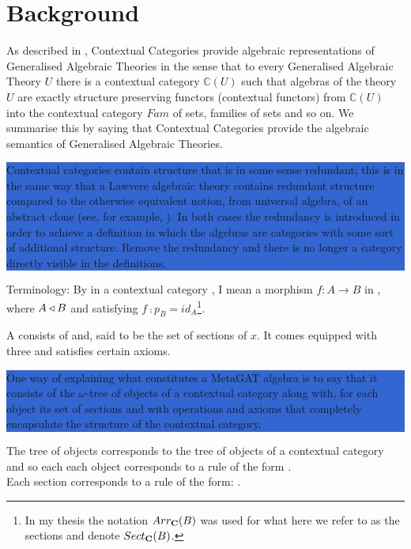 \documentclass[10pt,a4paper]{article}
\newcommand{\highlightpara}[1]{\colorbox{highlight}{%
    \parbox{\dimexpr\linewidth-2\fboxsep}%
        {#1}}
}
\begin{document}
\section{Background}
As described in \cite{Cartmell86}, Contextual Categories provide algebraic representations of Generalised Algebraic Theories  in the sense that to every Generalised Algebraic Theory $U$ there is a contextual category $\mathbb{C}(U)$ such that algebras of the theory $U$ are exactly structure preserving functors (contextual functors)  from $\mathbb{C}(U)$ into the contextual category $Fam$ of sets, families of sets and so on. We summarise this by saying that Contextual Categories provide the algebraic semantics of Generalised Algebraic Theories. 

\noindent
\highlightpara{Contextual categories contain structure that is in some sense redundant; this is in the same way that a Lawvere algebraic theory contains redundant structure compared to the otherwise equivalent notion, from universal algebra, of an abstract clone (see, for example, \cite{KerkoffonClones}). In both cases the redundancy is introduced in order to achieve a definition in which the algebras are categories with some sort of additional structure. Remove the redundancy and there is no longer a category directly visible in the definitions.}

Terminology: By 
 in a contextual category \catc, I mean a morphism $f:A\rightarrow B$ in \catc, where 
$A \triangleleft B$ and satisfying  $f \comp p_B = id_A$\footnote{In my thesis the notation $Arr_{\textbf{C}}(B)$ was used for what here we refer to as the sections and denote $Sect_{\textbf{C}}(B)$.}.


  
A  consists of  and, 
said to be the set of sections of $x$.
It comes equipped with three  and   
satisfies certain axioms.

\noindent
\highlightpara{One way of explaining what constitutes a  MetaGAT algebra is to say that it consists of the $\omega$-tree of objects of a contextual category along with, for each object 
its set of sections  and with operations and axioms that completely encapsulate the structure of the contextual category.} 

The tree of objects corresponds to the tree of objects of a contextual category and so each each object corresponds to  a rule of the form
. \\
Each  section corresponds to a rule of the form:
 .
\end{document}
